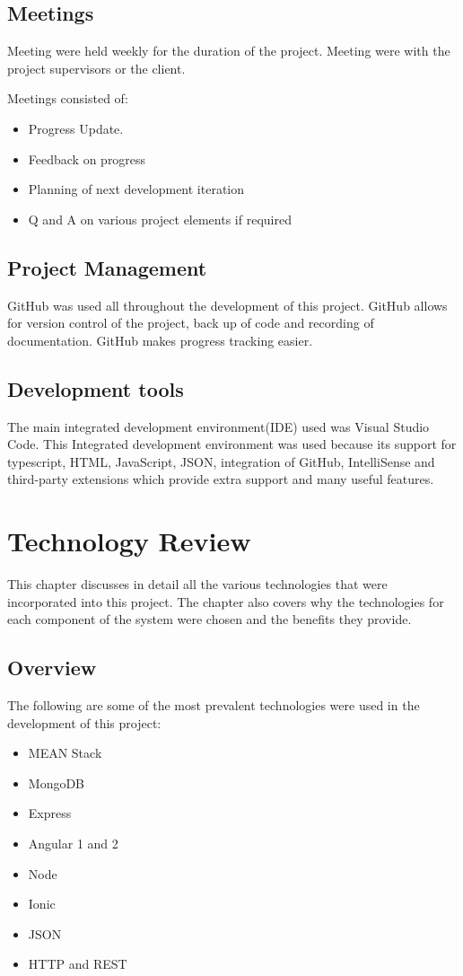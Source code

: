 \section{Meetings}
Meeting were held weekly for the duration of the project. Meeting were with the project supervisors or the client.

Meetings consisted of:
\begin{itemize}
\item Progress Update.
\item Feedback on progress
\item Planning of next development iteration
\item Q and A on various project elements if required
\end{itemize}
	
\section{Project Management}
GitHub was used all throughout the development of this project. GitHub allows for version control of the project, back up of code and recording of documentation. GitHub makes progress tracking easier.

\section{Development tools}
The main integrated development environment(IDE) used was Visual Studio Code. This Integrated development environment was used because its support for typescript, HTML, JavaScript, JSON, integration of GitHub, IntelliSense and third-party extensions which provide extra support and many useful features.

\chapter{Technology Review}
This chapter discusses in detail all the various technologies that were incorporated into this project. The chapter also covers why the technologies for each component of the system were chosen and the benefits they provide.

\section{Overview}
The following are some of the most prevalent technologies were used in the development of this project:
\begin{itemize}
\item MEAN Stack
\item MongoDB
\item Express
\item Angular 1 and 2
\item Node 
\item Ionic
\item JSON
\item HTTP and REST
\end{itemize}
	

